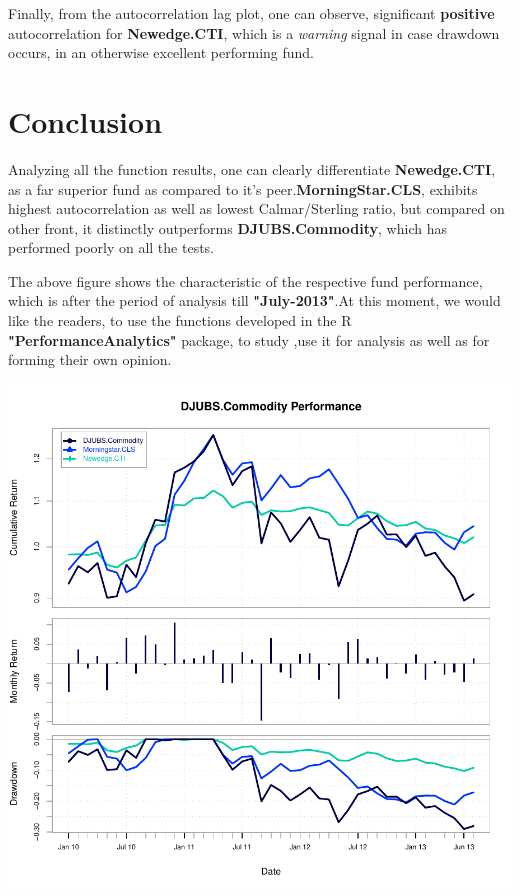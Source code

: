 \documentclass[12pt,letterpaper,english]{article}
\begin{document}
Finally, from the autocorrelation lag plot, one can observe, significant \textbf{positive} autocorrelation for \textbf{Newedge.CTI}, which is a \emph{warning} signal in case drawdown occurs, in an otherwise excellent performing fund.
\section{Conclusion}

Analyzing all the function results, one can clearly differentiate \textbf{Newedge.CTI}, as a far superior fund as compared to it's peer.\textbf{MorningStar.CLS}, exhibits highest autocorrelation as well as lowest Calmar/Sterling ratio, but compared on other front, it distinctly outperforms \textbf{DJUBS.Commodity}, which has performed poorly on all the tests. 

The above figure shows the characteristic of the respective fund performance, which is after the period of analysis till \textbf{"July-2013"}.At this moment, we would like the readers, to use the functions developed in the R \textbf{"PerformanceAnalytics"} package, to study ,use it for analysis as well as for forming their own opinion. 

\includegraphics{Commodity-012}
\end{document}
